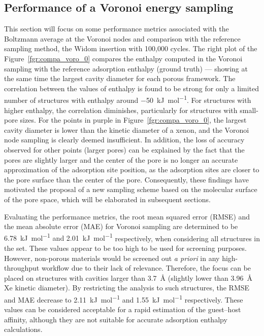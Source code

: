 \documentclass[main]{subfiles}
\begin{document}
\subsection{Performance of a Voronoi energy sampling}

This section will focus on some performance metrics associated with the Boltzmann average at the Voronoi nodes and comparison with the reference sampling method, the Widom insertion with 100,000 cycles. The right plot of the Figure~\ref{fgr:compa_voro_0} compares the enthalpy computed in the Voronoi sampling with the reference adsorption enthalpy (ground truth) --- showing at the same time the largest cavity diameter for each porous framework. The correlation between the values of enthalpy is found to be strong for only a limited number of structures with enthalpy around \SI{-50}{\kilo\joule\per\mole}. For structures with higher enthalpy, the correlation diminishes, particularly for structures with small-pore sizes. For the points in purple in Figure~\ref{fgr:compa_voro_0}, the largest cavity diameter is lower than the kinetic diameter of a xenon, and the Voronoi node sampling is clearly deemed insufficient. In addition, the loss of accuracy observed for other points (larger pores) can be explained by the fact that the pores are slightly larger and the center of the pore is no longer an accurate approximation of the adsorption site position, as the adsorption sites are closer to the pore surface than the center of the pore. Consequently, these findings have motivated the proposal of a new sampling scheme based on the molecular surface of the pore space, which will be elaborated in subsequent sections.

Evaluating the performance metrics, the root mean squared error (RMSE) {and the mean absolute error (MAE) for Voronoi sampling are determined to be \SI{6.78}{\kilo\joule\per\mole} and \SI{2.01}{\kilo\joule\per\mole}} respectively, when considering all structures in the set. These values appear to be too high to be used for screening purposes. However, non-porous materials would be screened out \emph{a priori} in any high-throughput workflow due to their lack of relevance. Therefore, the focus can be placed on structures with cavities larger than \SI{3.7}{\angstrom} (slightly lower than \SI{3.96}{\angstrom} Xe kinetic diameter). By restricting the analysis to such structures, {the RMSE and MAE decrease to \SI{2.11}{\kilo\joule\per\mole} and \SI{1.55}{\kilo\joule\per\mole} respectively}. These values can be considered acceptable for a rapid estimation of the guest--host affinity, although they are not suitable for accurate adsorption enthalpy calculations.
\end{document}
